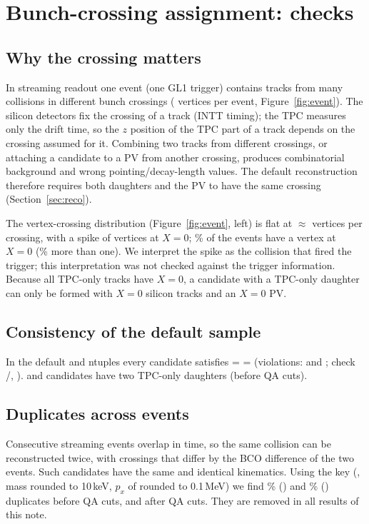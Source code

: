\section{Bunch-crossing assignment: checks}
\label{sec:crossing}

\subsection{Why the crossing matters}
In streaming readout one event (one GL1 trigger) contains tracks from many collisions in different
bunch crossings (\vtxPerEv{} vertices per event, Figure~\ref{fig:event}). The silicon detectors
fix the crossing of a track (INTT timing); the TPC measures only the drift time, so the $z$
position of the TPC part of a track depends on the crossing assumed for it. Combining two tracks
from different crossings, or attaching a candidate to a PV from another crossing, produces
combinatorial background and wrong pointing/decay-length values. The default reconstruction
therefore requires both daughters and the PV to have the same crossing
(Section~\ref{sec:reco}).

The vertex-crossing distribution (Figure~\ref{fig:event}, left) is flat at
$\approx$\vtxPerOtherX{} vertices per crossing, with a spike of \vtxAtXzero{} vertices at $X=0$;
\evVtxXzeroFrac\% of the events have a vertex at $X=0$ (\evVtxXzeroMultiFrac\% more than one).
We interpret the spike as the collision that fired the trigger; this interpretation was not
checked against the trigger information. Because all TPC-only tracks have $X=0$, a candidate
with a TPC-only daughter can only be formed with $X=0$ silicon tracks and an $X=0$ PV.

\subsection{Consistency of the default sample}
In the default \Ks{} and \Lam{} ntuples every candidate satisfies
 =  = 
(violations: \nViolXKs{} and \nViolXLambda; check \checkXKs/\checkXLambda,
). \nTTKs{} \Ks{} and \nTTLambda{} \Lam{} candidates have two
TPC-only daughters (before QA cuts).

\subsection{Duplicates across events}
\label{sec:dup}
Consecutive streaming events overlap in time, so the same collision can be reconstructed twice,
with crossings that differ by the BCO difference of the two events. Such candidates have the same
 and identical kinematics. Using the key (, mass rounded to
10\,keV, $p_x$ of  rounded to 0.1\,MeV) we find \dupFracKs\% (\Ks) and
\dupFracLambda\% (\Lam) duplicates before QA cuts, \dupQAKs{} and \dupQALambda{} after QA cuts. They
are removed in all results of this note.

